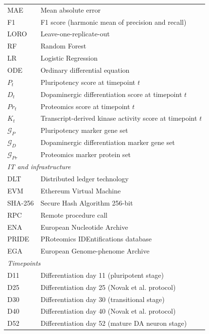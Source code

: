 \documentclass[5p,times,twocolumn]{elsarticle}
\begin{document}
\begin{table}[!htbp]
{\begin{tabular}{p{2.7cm} p{6.2cm}}
MAE         & Mean absolute error \\
F1          & F1 score (harmonic mean of precision and recall) \\
LORO        & Leave-one-replicate-out \\
RF          & Random Forest \\
LR          & Logistic Regression \\
ODE         & Ordinary differential equation \\
$P_t$       & Pluripotency score at timepoint $t$ \\
$D_t$       & Dopaminergic differentiation score at timepoint $t$ \\
$Pr_t$      & Proteomics score at timepoint $t$ \\
$K_t$       & Transcript-derived kinase activity score at timepoint $t$ \\
$\mathcal{G}_P$  & Pluripotency marker gene set \\
$\mathcal{G}_D$  & Dopaminergic differentiation marker gene set \\
$\mathcal{G}_{Pr}$ & Proteomics marker protein set \\
\midrule
\multicolumn{2}{l}{\textit{IT and infrastructure}} \\
\midrule
DLT         & Distributed ledger technology \\
EVM         & Ethereum Virtual Machine \\
SHA-256     & Secure Hash Algorithm 256-bit \\
RPC         & Remote procedure call \\
ENA         & European Nucleotide Archive \\
PRIDE       & PRoteomics IDEntifications database \\
EGA         & European Genome-phenome Archive \\
\midrule
\multicolumn{2}{l}{\textit{Timepoints}} \\
\midrule
D11         & Differentiation day 11 (pluripotent stage) \\
D25         & Differentiation day 25 (Novak et al. protocol) \\
D30         & Differentiation day 30 (transitional stage) \\
D40         & Differentiation day 40 (Novak et al. protocol) \\
D52         & Differentiation day 52 (mature DA neuron stage) \\
\bottomrule
\end{tabular}}
\end{table}
\end{document}

